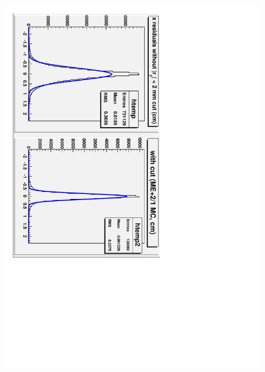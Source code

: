 \documentclass[compress]{beamer}
\begin{document}
\begin{frame}
\begin{columns}
\includegraphics[height=\linewidth, angle=90]{MC_residuals_detail2-xprojection-fits_ME21.pdf}
\end{columns}
\end{frame}
\end{document}
